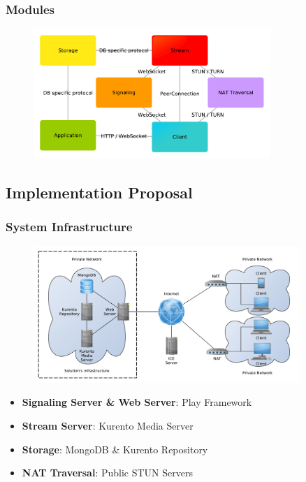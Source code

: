 \documentclass[compress]{beamer}
\begin{document}
	\begin{frame}[c]
		\frametitle{Modules}
		\begin{figure}[H]
			\includegraphics[width=0.8\textwidth]{figures/modules.pdf}
		\end{figure}
	\end{frame}

\subsection{Implementation Proposal}

		\begin{frame}[c]
		\frametitle{System Infrastructure}
		\begin{figure}[H]
			\includegraphics[width=0.9\textwidth]{figures/infrastructure.pdf}
		\end{figure}
		\begin{itemize}
		\scriptsize \item \textbf{Signaling Server \& Web Server}: Play Framework
		\scriptsize \item \textbf{Stream Server}: Kurento Media Server		
		\scriptsize \item \textbf{Storage}: MongoDB \& Kurento Repository
		\scriptsize \item \textbf{NAT Traversal}: Public STUN Servers
		\end{itemize}




		\end{frame}
\end{document}
